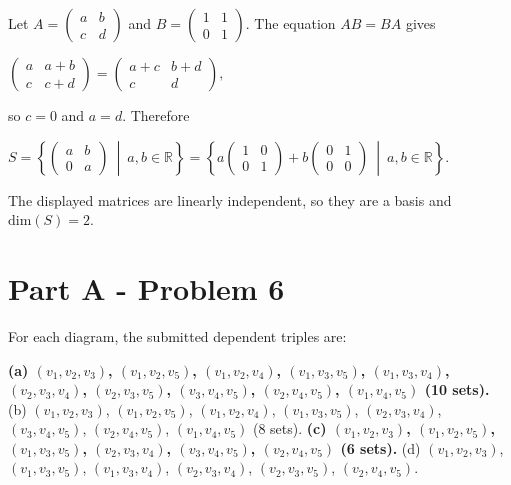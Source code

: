 Let \(A = \begin{pmatrix}
a & b \\
c & d
\end{pmatrix}\) and \(B = \begin{pmatrix}
1 & 1 \\
0 & 1
\end{pmatrix}\). The equation \(AB = BA\) gives

\(\begin{pmatrix}
a & {a + b} \\
c & {c + d}
\end{pmatrix} = \begin{pmatrix}
{a + c} & {b + d} \\
c & d
\end{pmatrix},\)

so \(c = 0\) and \(a = d\). Therefore

\(S = \left\{ \begin{pmatrix}
a & b \\
0 & a
\end{pmatrix}\  \middle| \ a,b \in \mathbb{R} \right\} = \left\{ a\begin{pmatrix}
1 & 0 \\
0 & 1
\end{pmatrix} + b\begin{pmatrix}
0 & 1 \\
0 & 0
\end{pmatrix}\  \middle| \ a,b \in \mathbb{R} \right\}.\)

The displayed matrices are linearly independent, so they are a basis and \(\text{dim}(S) = 2\).

\section{Part A - Problem 6}

For each diagram, the submitted dependent triples are:

\textbf{(a) \(\left( {v_{1},v_{2},v_{3}} \right)\), \(\left( {v_{1},v_{2},v_{5}} \right)\), \(\left( {v_{1},v_{2},v_{4}} \right)\), \(\left( {v_{1},v_{3},v_{5}} \right)\), \(\left( {v_{1},v_{3},v_{4}} \right)\), \(\left( {v_{2},v_{3},v_{4}} \right)\), \(\left( {v_{2},v_{3},v_{5}} \right)\), \(\left( {v_{3},v_{4},v_{5}} \right)\), \(\left( {v_{2},v_{4},v_{5}} \right)\), \(\left( {v_{1},v_{4},v_{5}} \right)\) (10 sets).} (b) \(\left( {v_{1},v_{2},v_{3}} \right)\), \(\left( {v_{1},v_{2},v_{5}} \right)\), \(\left( {v_{1},v_{2},v_{4}} \right)\), \(\left( {v_{1},v_{3},v_{5}} \right)\), \(\left( {v_{2},v_{3},v_{4}} \right)\), \(\left( {v_{3},v_{4},v_{5}} \right)\), \(\left( {v_{2},v_{4},v_{5}} \right)\), \(\left( {v_{1},v_{4},v_{5}} \right)\) (8 sets). \textbf{(c) \(\left( {v_{1},v_{2},v_{3}} \right)\), \(\left( {v_{1},v_{2},v_{5}} \right)\), \(\left( {v_{1},v_{3},v_{5}} \right)\), \(\left( {v_{2},v_{3},v_{4}} \right)\), \(\left( {v_{3},v_{4},v_{5}} \right)\), \(\left( {v_{2},v_{4},v_{5}} \right)\) (6 sets).} (d) \(\left( {v_{1},v_{2},v_{3}} \right)\), \(\left( {v_{1},v_{3},v_{5}} \right)\), \(\left( {v_{1},v_{3},v_{4}} \right)\), \(\left( {v_{2},v_{3},v_{4}} \right)\), \(\left( {v_{2},v_{3},v_{5}} \right)\), \(\left( {v_{2},v_{4},v_{5}} \right)\).

